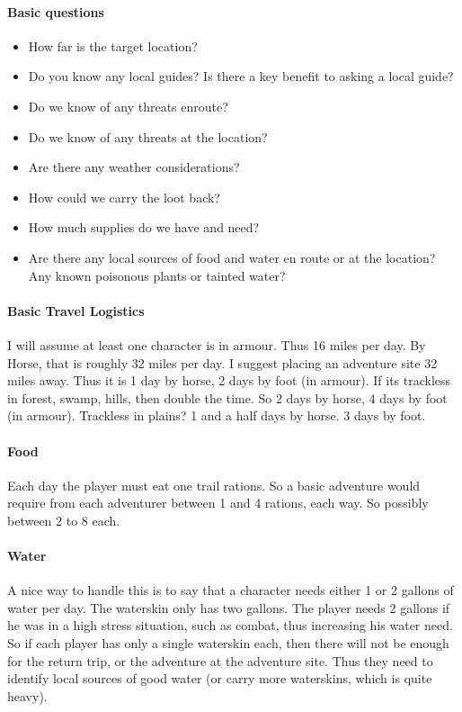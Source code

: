 
\begin{multicols}{2}



\paragraph{Basic questions}

\begin{itemize}
    \item How far is the target location?
    \item Do you know any local guides? Is there a key benefit to asking a local guide?
    \item Do we know of any threats enroute?
    \item Do we know of any threats at the location?
    \item Are there any weather considerations?
    \item How could we carry the loot back?
    \item How much supplies do we have and need?
    \item Are there any local sources of food and water en route or at the location? Any known poisonous plants or tainted water?
\end{itemize}

\paragraph{Basic Travel Logistics} I will assume at least one character is in armour. Thus 16 miles per day. By Horse, that is roughly 32 miles per day. I suggest placing an adventure site 32 miles away. Thus it is 1 day by horse, 2 days by foot (in armour). If its trackless in forest, swamp, hills, then double the time. So 2 days by horse, 4 days by foot (in armour). Trackless in plains? 1 and a half days by horse. 3 days by foot.

\paragraph{Food} Each day the player must eat one trail rations. So a basic adventure would require from each adventurer between 1 and 4 rations, each way. So possibly between 2 to 8 each.

\paragraph{Water} A nice way to handle this is to say that a character needs either 1 or 2 gallons of water per day. The waterskin only has two gallons. The player needs 2 gallons if he was in a high stress situation, such as combat, thus increasing his water need. So if each player has only a single waterskin each, then there will not be enough for the return trip, or the adventure at the adventure site. Thus they need to identify local sources of good water (or carry more waterskins, which is quite heavy).


\end{multicols}
